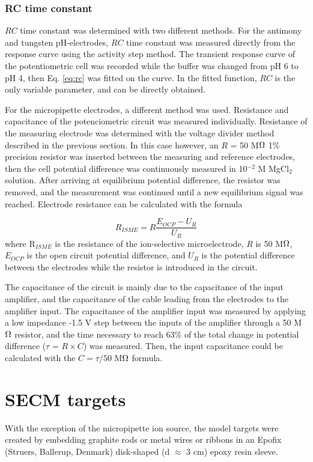 			\subsubsection{RC time constant}
$RC$ time constant was determined with two different methods.
For the antimony and tungsten pH-electrodes, $RC$ time constant was measured directly from the response curve using the activity step method.
The transient response curve of the potentiometric cell was recorded while the buffer was changed from pH 6 to pH 4, then Eq. \ref{eq:rc} was fitted on the curve.
In the fitted function, $RC$ is the only variable parameter, and can be directly obtained.

For the micropipette electrodes, a different method was used.
Resistance and capacitance of the potenciometric circuit was measured individually.
Resistance of the measuring electrode was determined with the voltage divider method described in the previous section.
In this case however, an $R$ = 50 M$\ohm$ 1\% precision resistor was inserted between the measuring and reference electrodes, then the cell potential difference was continuously measured in 10$^{-2}$ M MgCl$_2$ solution.
After arriving at equilibrium potential difference, the resistor was removed, and the measurement was continued until a new equilibrium signal was reached.
Electrode resistance can be calculated with the formula

\begin{equation}
\label{eq:divider}
        R_{ISME}
        =
        R
        \frac
                {E_{OCP} - U_{R}}
                {U_{R}}
\end{equation}
where R$_{ISME}$ is the resistance of the ion-selective microelectrode, $R$ is 50 M$\ohm$, $E_{OCP}$ is the open circuit potential difference, and $U_{R}$ is the potential difference between the electrodes while the resistor is introduced in the circuit.

The capacitance of the circuit is mainly due to the capacitance of the input amplifier, and the capacitance of the cable leading from the electrodes to the amplifier input.
The capacitance of the amplifier input was measured by applying a low impedance -1.5 V step between the inputs of the amplifier through a 50 M$\ohm$ resistor, and the time necessary to reach 63\% of the total change in potential difference ($\tau$ = $R\times C$) was measured.
Then, the input capacitance could be calculated with the $C = \tau/50$ M$\ohm$ formula.
		
	\section{SECM targets}
With the exception of the micropipette ion source, the model targets were created by embedding graphite rods or metal wires or ribbons in an Epofix (Struers, Ballerup, Denmark) disk-shaped (d $\approx$ 3 cm) epoxy resin sleeve. 
